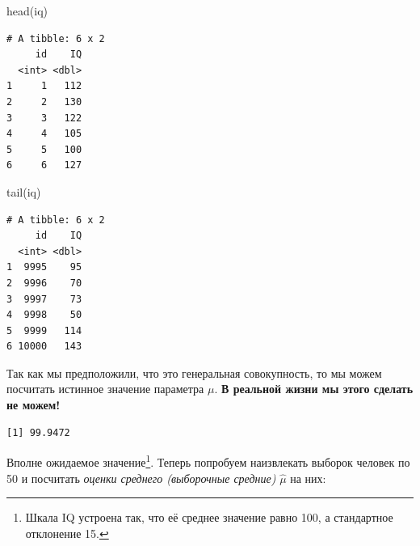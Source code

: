 \documentclass[
  letterpaper,
  DIV=11,
  numbers=noendperiod]{scrreprt}
\newenvironment{Shaded}{}{}
\newcommand{\FunctionTok}[1]{\textcolor[rgb]{0.44,0.26,0.76}{#1}}
\newcommand{\NormalTok}[1]{\textcolor[rgb]{0.14,0.16,0.18}{#1}}
\newcommand{\SpecialCharTok}[1]{\textcolor[rgb]{0.00,0.36,0.77}{#1}}
\theoremstyle{definition}
\theoremstyle{remark}
\begin{document}
\begin{Shaded}
\begin{Highlighting}[]
\FunctionTok{head}\NormalTok{(iq)}
\end{Highlighting}
\end{Shaded}

\begin{verbatim}
# A tibble: 6 x 2
     id    IQ
  <int> <dbl>
1     1   112
2     2   130
3     3   122
4     4   105
5     5   100
6     6   127
\end{verbatim}

\begin{Shaded}
\begin{Highlighting}[]
\FunctionTok{tail}\NormalTok{(iq)}
\end{Highlighting}
\end{Shaded}

\begin{verbatim}
# A tibble: 6 x 2
     id    IQ
  <int> <dbl>
1  9995    95
2  9996    70
3  9997    73
4  9998    50
5  9999   114
6 10000   143
\end{verbatim}

Так как мы предположили, что это генеральная совокупность, то мы можем
посчитать истинное значение параметра \(\mu\). \textbf{В реальной жизни
мы этого сделать не можем!}

\begin{Shaded}
\end{Shaded}

\begin{verbatim}
[1] 99.9472
\end{verbatim}

Вполне ожидаемое значение\footnote{Шкала IQ устроена так, что её среднее
  значение равно 100, а стандартное отклонение 15.}. Теперь попробуем
наизвлекать выборок человек по 50 и посчитать \emph{оценки среднего
(выборочные средние)} \(\hat \mu\) на них:
\end{document}
